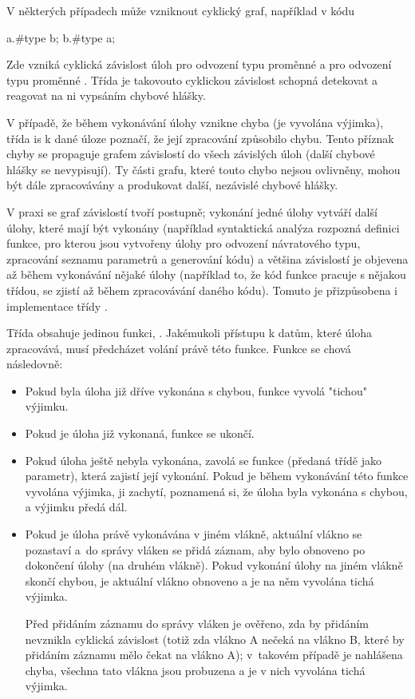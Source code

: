 
V některých případech může vzniknout cyklický graf, například v kódu

\begin{code}
a.#type b;
b.#type a;
\end{code}

Zde vzniká cyklická závislost úloh pro odvození typu proměnné  a pro odvození typu proměnné . Třída  je takovouto cyklickou závislost schopná detekovat a reagovat na ni vypsáním chybové hlášky.

V případě, že během vykonávání úlohy vznikne chyba (je vyvolána výjimka), třída  is k dané úloze poznačí, že její zpracování způsobilo chybu. Tento příznak chyby se propaguje grafem závislostí do všech závislých úloh (další chybové hlášky se nevypisují). Ty části grafu, které touto chybo nejsou ovlivněny, mohou být dále zpracovávány a produkovat další, nezávislé chybové hlášky.

V praxi se graf závislostí tvoří postupně; vykonání jedné úlohy vytváří další úlohy, které mají být vykonány (například syntaktická analýza rozpozná definici funkce, pro kterou jsou vytvořeny úlohy pro odvození návratového typu, zpracování seznamu parametrů a generování kódu) a většina závislostí je objevena až během vykonávání nějaké úlohy (například to, že kód funkce pracuje s nějakou třídou, se zjistí až během zpracovávání daného kódu). Tomuto je přizpůsobena i implementace třídy .

Třída  obsahuje jedinou funkci, . Jakémukoli přístupu k datům, které úloha zpracovává, musí předcházet volání právě této funkce. Funkce se chová následovně:
\begin{itemize}
	\item Pokud byla úloha již dříve vykonána s chybou, funkce vyvolá "tichou" výjimku.
	\item Pokud je úloha již vykonaná, funkce se ukončí.
	\item Pokud úloha ještě nebyla vykonána, zavolá se funkce (předaná třídě  jako parametr), která zajistí její vykonání. Pokud je během vykonávání této funkce vyvolána výjimka,  ji zachytí, poznamená si, že úloha byla vykonána s chybou, a výjimku předá dál.
	\item Pokud je úloha právě vykonávána v jiném vlákně, aktuální vlákno se pozastaví a~do správy vláken se přidá záznam, aby bylo obnoveno po dokončení úlohy (na druhém vlákně). Pokud vykonání úlohy na jiném vlákně skončí chybou, je aktuální vlákno obnoveno a je na něm vyvolána tichá výjimka.
	
	Před přidáním záznamu do správy vláken je ověřeno, zda by přidáním nevznikla cyklická závislost (totiž zda vlákno A nečeká na vlákno B, které by přidáním záznamu mělo čekat na vlákno A); v~takovém případě je nahlášena chyba, všechna tato vlákna jsou probuzena a je v nich vyvolána tichá výjimka.
\end{itemize}

